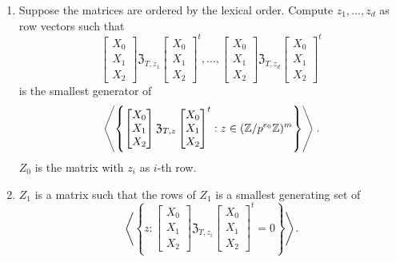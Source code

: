\begin{definition}
\begin{enumerate}
\item Suppose the matrices are ordered by the lexical order. Compute $z_1, \dots, z_d$ as row vectors such that \[\begin{bmatrix} X_0 \\ X_1 \\ X_2\end{bmatrix} \mathfrak{Z}_{T, z_1} \begin{bmatrix} X_0 \\ X_1 \\ X_2 \end{bmatrix}^t, \dots, \begin{bmatrix} X_0 \\ X_1 \\ X_2 \end{bmatrix} \mathfrak{Z}_{T, z_d} \begin{bmatrix} X_0 \\ X_1 \\ X_2 \end{bmatrix}^t\] is the smallest generator of \[\left\langle \left\{\begin{bmatrix} X_0 \\ X_1 \\ X_2 \end{bmatrix} \mathfrak{Z}_{T, z} \begin{bmatrix} X_0 \\ X_1  \\ X_2 \end{bmatrix}^t: z \in (\mathbb{Z} / p^{e_0} \mathbb{Z})^m\right\}\right\rangle.\]
$Z_0$ is the matrix with $z_i$ as $i$-th row.
\item $Z_1$ is a matrix such that the rows of $Z_1$ is a smallest generating set of \[\left\langle \left\{z : \begin{bmatrix} X_0 \\ X_1  \\ X_2 \end{bmatrix} \mathfrak{Z}_{T, z_i} \begin{bmatrix} X_0 \\ X_1 \\ X_2 \end{bmatrix}^t = 0\right\} \right\rangle. \]

\end{enumerate}
\end{definition}
